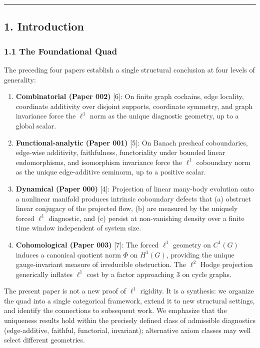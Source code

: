 \documentclass[
]{article}
\begin{document}
\begin{center}\rule{0.5\linewidth}{0.5pt}\end{center}

\subsection{1. Introduction}\label{introduction}

\subsubsection{1.1 The Foundational Quad}\label{the-foundational-quad}

The preceding four papers establish a single structural conclusion at
four levels of generality:

\begin{enumerate}
\def\labelenumi{\arabic{enumi}.}
\item
  \textbf{Combinatorial (Paper 002)} {[}6{]}: On finite graph cochains,
  edge locality, coordinate additivity over disjoint supports,
  coordinate symmetry, and graph invariance force the \(\ell^1\) norm as
  the unique diagnostic geometry, up to a global scalar.
\item
  \textbf{Functional-analytic (Paper 001)} {[}5{]}: On Banach presheaf
  coboundaries, edge-wise additivity, faithfulness, functoriality under
  bounded linear endomorphisms, and isomorphism invariance force the
  \(\ell^1\) coboundary norm as the unique edge-additive seminorm, up to
  a positive scalar.
\item
  \textbf{Dynamical (Paper 000)} {[}4{]}: Projection of linear many-body
  evolution onto a nonlinear manifold produces intrinsic coboundary
  defects that (a) obstruct linear conjugacy of the projected flow, (b)
  are measured by the uniquely forced \(\ell^1\) diagnostic, and (c)
  persist at non-vanishing density over a finite time window independent
  of system size.
\item
  \textbf{Cohomological (Paper 003)} {[}7{]}: The forced \(\ell^1\)
  geometry on \(C^1(G)\) induces a canonical quotient norm \(\Phi\) on
  \(H^1(G)\), providing the unique gauge-invariant measure of
  irreducible obstruction. The \(\ell^2\) Hodge projection generically
  inflates \(\ell^1\) cost by a factor approaching 3 on cycle graphs.
\end{enumerate}

The present paper is not a new proof of \(\ell^1\) rigidity. It is a
synthesis: we organize the quad into a single categorical framework,
extend it to new structural settings, and identify the connections to
subsequent work. We emphasize that the uniqueness results hold within
the precisely defined class of admissible diagnostics (edge-additive,
faithful, functorial, invariant); alternative axiom classes may well
select different geometries.
\end{document}

